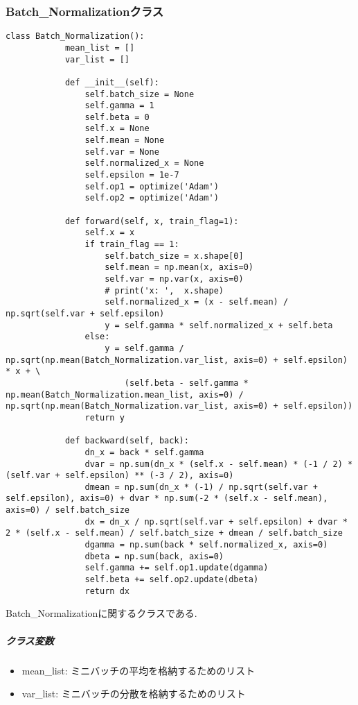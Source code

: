 \documentclass[a4j, titlepage]{jarticle}
\begin{document}
    \subsubsection{Batch\_Normalizationクラス}
        \begin{lstlisting}[caption=Batch\_Normalizationに関する計算 ,label=fuga]
        class Batch_Normalization():
            mean_list = []
            var_list = []

            def __init__(self):
                self.batch_size = None
                self.gamma = 1
                self.beta = 0
                self.x = None
                self.mean = None
                self.var = None
                self.normalized_x = None
                self.epsilon = 1e-7
                self.op1 = optimize('Adam')
                self.op2 = optimize('Adam')

            def forward(self, x, train_flag=1):
                self.x = x
                if train_flag == 1:
                    self.batch_size = x.shape[0]
                    self.mean = np.mean(x, axis=0)
                    self.var = np.var(x, axis=0)
                    # print('x: ',  x.shape)
                    self.normalized_x = (x - self.mean) / np.sqrt(self.var + self.epsilon)
                    y = self.gamma * self.normalized_x + self.beta
                else:
                    y = self.gamma / np.sqrt(np.mean(Batch_Normalization.var_list, axis=0) + self.epsilon) * x + \
                        (self.beta - self.gamma * np.mean(Batch_Normalization.mean_list, axis=0) / np.sqrt(np.mean(Batch_Normalization.var_list, axis=0) + self.epsilon))
                return y

            def backward(self, back):
                dn_x = back * self.gamma
                dvar = np.sum(dn_x * (self.x - self.mean) * (-1 / 2) * (self.var + self.epsilon) ** (-3 / 2), axis=0)
                dmean = np.sum(dn_x * (-1) / np.sqrt(self.var + self.epsilon), axis=0) + dvar * np.sum(-2 * (self.x - self.mean), axis=0) / self.batch_size
                dx = dn_x / np.sqrt(self.var + self.epsilon) + dvar * 2 * (self.x - self.mean) / self.batch_size + dmean / self.batch_size
                dgamma = np.sum(back * self.normalized_x, axis=0)
                dbeta = np.sum(back, axis=0)
                self.gamma += self.op1.update(dgamma)
                self.beta += self.op2.update(dbeta)
                return dx
        \end{lstlisting}
        Batch\_Normalizationに関するクラスである.
            \subparagraph*{クラス変数}
            \begin{itemize}
                \item mean\_list: ミニバッチの平均を格納するためのリスト
                \item var\_list: ミニバッチの分散を格納するためのリスト
            \end{itemize}
\end{document}
